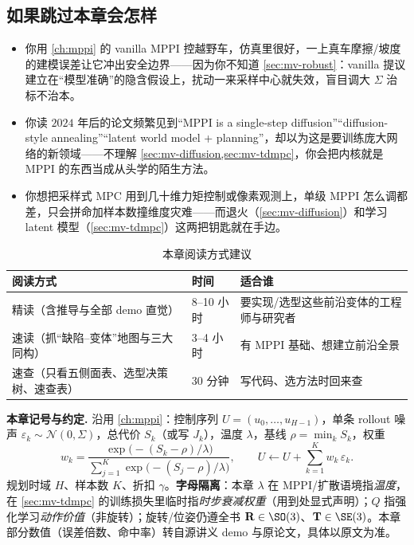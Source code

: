 \subsection*{如果跳过本章会怎样}
\begin{itemize}
  \item 你用 \cref{ch:mppi} 的 vanilla MPPI 控越野车，仿真里很好，一上真车摩擦/坡度的建模误差让它冲出安全边界——因为你不知道 \cref{sec:mv-robust}：vanilla 提议建立在“模型准确”的隐含假设上，扰动一来采样中心就失效，盲目调大 $\Sigma$ 治标不治本。
  \item 你读 $2024$ 年后的论文频繁见到“MPPI is a single-step diffusion”“diffusion-style annealing”“latent world model + planning”，却以为这是要训练庞大网络的新领域——不理解 \cref{sec:mv-diffusion,sec:mv-tdmpc}，你会把内核就是 MPPI 的东西当成从头学的陌生方法。
  \item 你想把采样式 MPC 用到几十维力矩控制或像素观测上，单级 MPPI 怎么调都差，只会拼命加样本数撞维度灾难——而退火（\cref{sec:mv-diffusion}）和学习 latent 模型（\cref{sec:mv-tdmpc}）这两把钥匙就在手边。
\end{itemize}

\begin{table}[H]\centering\small
\caption{本章阅读方式建议}
\label{tab:mv-reading}
\begin{tabular}{lll}
\toprule
阅读方式 & 时间 & 适合谁 \\
\midrule
精读（含推导与全部 demo 直觉） & 8--10 小时 & 要实现/选型这些前沿变体的工程师与研究者 \\
速读（抓“缺陷--变体”地图与三大同构） & 3--4 小时 & 有 MPPI 基础、想建立前沿全景 \\
速查（只看五侧面表、选型决策树、速查表） & 30 分钟 & 写代码、选方法时回来查 \\
\bottomrule
\end{tabular}
\end{table}

\begin{note}
\textbf{本章记号与约定.}\;
沿用 \cref{ch:mppi}：控制序列 $U=(u_0,\dots,u_{H-1})$，单条 rollout 噪声 $\varepsilon_k\sim\mathcal{N}(0,\Sigma)$，总代价 $S_k$（或写 $J_k$），温度 $\lambda$，基线 $\rho=\min_k S_k$，权重
\begin{equation}
  w_k=\frac{\exp\!\big(-(S_k-\rho)/\lambda\big)}{\sum_{j=1}^{K}\exp\!\big(-(S_j-\rho)/\lambda\big)},\qquad
  U\leftarrow U+\sum_{k=1}^{K}w_k\,\varepsilon_k.
  \label{eq:mv-mppi-update}
\end{equation}
规划时域 $H$、样本数 $K$、折扣 $\gamma$。\textbf{字母隔离}：本章 $\lambda$ 在 MPPI/扩散语境指\emph{温度}，在 \cref{sec:mv-tdmpc} 的训练损失里临时指\emph{时步衰减权重}（用到处显式声明）；$Q$ 指强化学习\emph{动作价值}（非旋转）；旋转/位姿仍遵全书 $\mathbf{R}\in\SO(3)$、$\mathbf{T}\in\SE(3)$。本章部分数值（误差倍数、命中率）转自源讲义 demo 与原论文，具体以原文为准。
\end{note}

